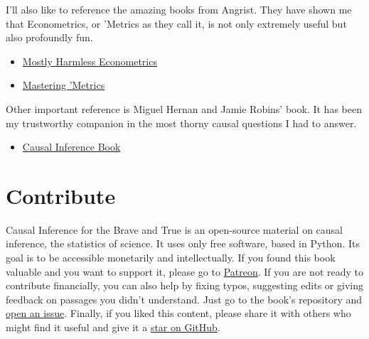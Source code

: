 \documentclass[
  letterpaper,
  DIV=11,
  numbers=noendperiod]{scrreprt}
\providecommand{\tightlist}{%
  \setlength{\itemsep}{0pt}\setlength{\parskip}{0pt}}\usepackage{longtable,booktabs,array}
\begin{document}
I'll also like to reference the amazing books from Angrist. They have
shown me that Econometrics, or 'Metrics as they call it, is not only
extremely useful but also profoundly fun.

\begin{itemize}
\tightlist
\item
  \href{https://www.mostlyharmlesseconometrics.com/}{Mostly Harmless
  Econometrics}
\item
  \href{https://www.masteringmetrics.com/}{Mastering 'Metrics}
\end{itemize}

Other important reference is Miguel Hernan and Jamie Robins' book. It
has been my trustworthy companion in the most thorny causal questions I
had to answer.

\begin{itemize}
\tightlist
\item
  \href{https://www.hsph.harvard.edu/miguel-hernan/causal-inference-book/}{Causal
  Inference Book}
\end{itemize}

\hypertarget{contribute}{%
\section{Contribute}\label{contribute}}

Causal Inference for the Brave and True is an open-source material on
causal inference, the statistics of science. It uses only free software,
based in Python. Its goal is to be accessible monetarily and
intellectually. If you found this book valuable and you want to support
it, please go to
\href{https://www.patreon.com/causal_inference_for_the_brave_and_true}{Patreon}.
If you are not ready to contribute financially, you can also help by
fixing typos, suggesting edits or giving feedback on passages you didn't
understand. Just go to the book's repository and
\href{https://github.com/matheusfacure/python-causality-handbook/issues}{open
an issue}. Finally, if you liked this content, please share it with
others who might find it useful and give it a
\href{https://github.com/matheusfacure/python-causality-handbook/stargazers}{star
on GitHub}.
\end{document}
